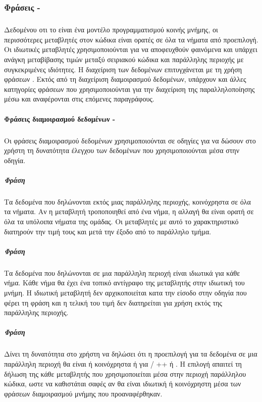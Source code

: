       
      
\subsubsection{Φράσεις - }
\subparagraph{}
Δεδομένου οτι το \emph{} είναι ένα μοντέλο προγραμματισμού κοινής μνήμης, οι περισσότερες μεταβλητές στον κώδικα \emph{} είναι ορατές σε όλα τα νήματα από προεπιλογή. Οι ιδιωτικές μεταβλητές χρησιμοποιούνται για να αποφευχθούν φαινόμενα  \emph{} και υπάρχει ανάγκη μεταβίβασης τιμών μεταξύ σειριακού κώδικα και παράλληλης περιοχής με συγκεκριμένες ιδιότητες. Η διαχείριση των δεδομένων επιτυγχάνεται με τη χρήση φράσεων \emph{}. 
Εκτός από τη διαχείριση διαμοιρασμού δεδομένων, υπάρχουν και άλλες κατηγορίες φράσεων που χρησιμοποιούνται για την διαχείριση της παραλληλοποίησης μέσω \emph{} και αναφέρονται στις επόμενες παραγράφους.

\paragraph{Φράσεις διαμοιρασμού δεδομένων - }
\subparagraph{}
Οι φράσεις διαμοιρασμού δεδομένων χρησιμοποιούνται σε οδηγίες για να δώσουν στο χρήστη τη δυνατότητα έλεγχου των δεδομένων που χρησιμοποιούνται μέσα στην οδηγία.

\subparagraph{Φράση \emph{}}
\subparagraph{}
Τα δεδομένα που δηλώνονται εκτός μιας παράλληλης περιοχής, κοινόχρηστα σε όλα τα νήματα. Αν η μεταβλητή τροποποιηθεί από ένα νήμα, η αλλαγή θα είναι ορατή σε όλα τα υπόλοιπα νήματα της ομάδας. Οι μεταβλητές με αυτό το χαρακτηριστικό διατηρούν την τιμή τους και μετά την έξοδο από το παράλληλο τμήμα.

\subparagraph{Φράση \emph{}}
\subparagraph{}
Τα δεδομένα που δηλώνονται σε μια παράλληλη περιοχή είναι ιδιωτικά για κάθε νήμα. Κάθε νήμα θα έχει ένα τοπικό αντίγραφο της μεταβλητής στην ιδιωτική του μνήμη. Η ιδιωτική μεταβλητή δεν αρχικοποιείται κατα την είσοδο στην οδηγία που φέρει τη φράση \emph{} και η τελική του τιμή δεν διατηρείται για χρήση εκτός της παράλληλης περιοχής.

\subparagraph{Φράση \emph{}}
\subparagraph{}
Δίνει τη δυνατότητα στο χρήστη να δηλώσει ότι η προεπιλογή για τα δεδομένα σε μια παράλληλη περιοχή θα είναι ή κοινόχρηστα ή \emph{} για  / ++ ή {}. Η επιλογή \emph{} απαιτεί τη δήλωση της κάθε μεταβλητής που χρησιμοποιείται μέσα στην περιοχή παράλληλου κώδικα, ωστε να καθιστάται σαφές αν θα είναι ιδιωτική ή κοινόχρηστη μέσα των φράσεων διαμοιρασμού μνήμης που προαναφέρθηκαν.

